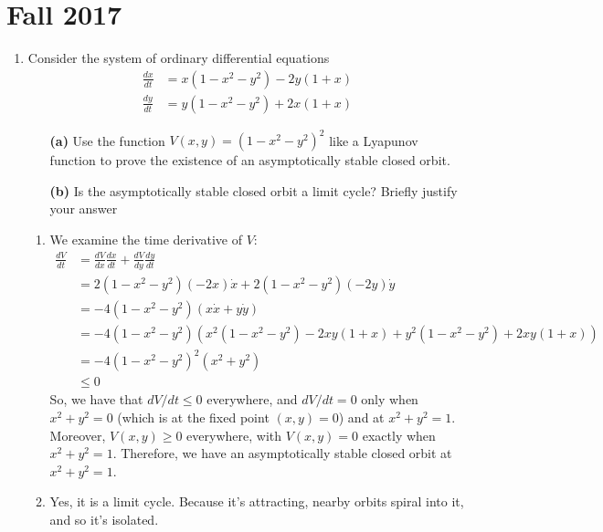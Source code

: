 \documentclass[10pt,letterpaper]{report}
\newcommand{\dd}[2]{\frac{d{#1}}{d{#2}}}
\renewcommand{\chaptermark}[1]{%
\markboth{#1}{}}
\begin{document}
\chapter*{Fall 2017}
\chaptermark{Fall 2017}
\begin{enumerate}
\item 
\begin{qbox}
Consider the system of ordinary differential equations
\begin{align*}
    \frac{dx}{dt} &= x(1-x^2-y^2) - 2y(1+x)
    \\
    \frac{dy}{dt} &= y(1-x^2-y^2) + 2x(1+x)
\end{align*}
\begin{itemize}
    \item[\textbf{(a)}] Use the function $V(x, y) = (1 - x^2 - y^2)^2$ like a Lyapunov function to prove the existence of an asymptotically stable closed orbit.
    \item[\textbf{(b)}] Is the asymptotically stable closed orbit a limit cycle? Briefly justify your answer
\end{itemize}
\end{qbox}
\begin{enumerate}
    \item We examine the time derivative of $V$:
    \begin{align*}
        \frac{dV}{dt} &= \frac{dV}{dx}\dd{x}{t} + \dd{V}{y} \dd{y}{t}
        \\
        &= 2(1-x^2 - y^2)(-2x)\dot x + 2(1-x^2-y^2)(-2y)\dot y
        \\
        &=
        -4\left(1-x^2-y^2\right)(x\dot x + y \dot y)
        \\
        &=
        -4\left(1-x^2-y^2\right)\left(x^2(1-x^2-y^2) - 2xy(1+x) + y^2(1-x^2-y^2) + 2xy(1+x)\right)
        \\
        &=
        -4\left(1-x^2-y^2\right)^2\left(x^2+y^2\right)
        \\
        &\leq 0
    \end{align*}
    So, we have that $dV/dt \leq 0$ everywhere, and $dV/dt = 0$ only when $x^2 + y^2 = 0$ (which is at the fixed point $(x, y) = 0$) and at $x^2 + y^2 = 1$. Moreover, $V(x, y) \geq 0$ everywhere, with $V(x, y) = 0$ exactly when $x^2 + y^2 = 1$. Therefore, we have an asymptotically stable closed orbit at $x^2 + y^2 = 1$.
    
    \item Yes, it is a limit cycle. Because it's attracting, nearby orbits spiral into it, and so it's isolated.
\end{enumerate}


\end{enumerate}
\end{document}
